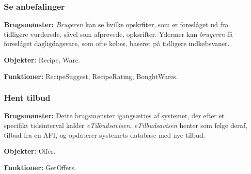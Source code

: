 \subsubsection*{Se anbefalinger}
\textbf{Brugsmønster:} \textit{Brugeren} kan se hvilke opskrfiter, som er foreslåget ud fra tidligere vurderede, såvel som afprøvede, opksrifter.
Ydermer kan \textit{brugeren} få foreslåget dagligdagsvare, som ofte købes, baseret på tidligere indkøbsvaner.

\textbf{Objekter:} Recipe, Ware.

\textbf{Funktioner:} RecipeSuggest, RecipeRating, BoughtWares.

\subsubsection*{Hent tilbud}
\textbf{Brugsmønster:} Dette brugsmønster igangsættes af systemet, der efter et specifikt tidsinterval kalder \textit{eTilbudsavisen}.
\textit{eTilbudsavisen} henter som følge deraf, tilbud fra en API, og opdaterer systemets database med nye tilbud.

\textbf{Objekter:} Offer.

\textbf{Funktioner:} GetOffers.